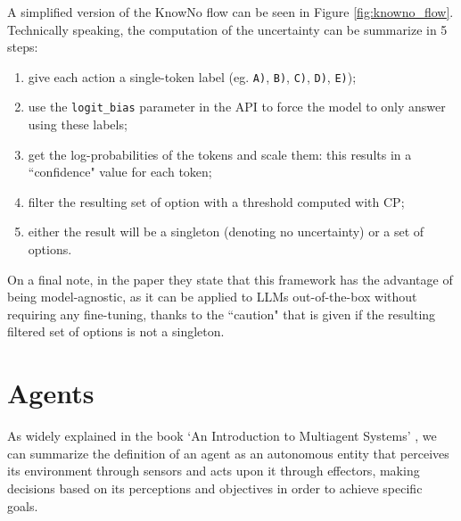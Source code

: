 A simplified version of the KnowNo flow can be seen in Figure
\ref{fig:knowno_flow}. Technically speaking, the computation of the uncertainty
can be summarize in 5 steps:
\begin{enumerate}
  \item give each action a single-token label (eg. \texttt{A)}, \texttt{B)}, \texttt{C)},
    \texttt{D)}, \texttt{E)});

  \item use the \texttt{logit\_bias} parameter in the API to force the model to
    only answer using these labels;

  \item get the log-probabilities of the tokens and scale them: this results in
    a ``confidence" value for each token;

  \item filter the resulting set of option with a threshold computed with CP;

  \item either the result will be a singleton (denoting no uncertainty) or a set
    of options.
\end{enumerate}

On a final note, in the paper they state that this framework has the advantage of
being model-agnostic, as it can be applied to LLMs out-of-the-box without
requiring any fine-tuning, thanks to the ``caution" that is given if the
resulting filtered set of options is not a singleton.

\section{Agents}
\label{sec:agents}


As widely explained in the book `An Introduction to Multiagent Systems'
\cite{wooldridge2002multiagent}, we can summarize the definition of an agent as an
autonomous entity that perceives its environment through sensors and acts upon it
through effectors, making decisions based on its perceptions and objectives in
order to achieve specific goals.

